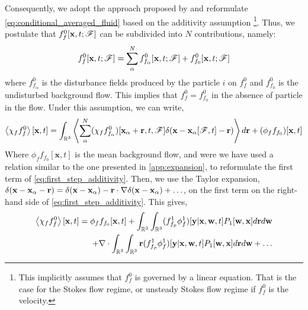 Consequently, we adopt the approach proposed by \citet{batchelor1972sedimentation} and reformulate \ref{eq:conditional_averaged_fluid} based on the additivity assumption \footnote{
    This implicitly assumes that $f_f^0$ is governed by a linear equation. 
    That is the case for the Stokes flow regime, or unsteady Stokes flow regime if $f_f^0$ is the velocity. 
}. 
Thus, we postulate that $f_f^0[\textbf{x},t;\mathscr{F}]$ can be subdivided into $N$ contributions, namely:  
\begin{equation}
    f_f^0[\textbf{x},t;\mathscr{F}]
    = 
    \sum_\alpha^N
    f_{f_\alpha}^0[\textbf{x},t;\mathscr{F}]
    + f_{f_0}^0[\textbf{x},t;\mathscr{F}]
\end{equation}
where $f_{f_\alpha}^0$ is the disturbance fields produced by the particle $i$ on $f_f^0$ and $f_{f_0}^0$ is the undisturbed background flow. 
This implies that $f_{f}^0 = f_{f_0}^0$ in the absence of particle in the flow. 
Under this assumption, we can write, 
\begin{equation}
    \avg{\chi_f f_f^0}[\textbf{x},t]
    = 
    \int_{\mathbb{R}^3} 
    \avg{
        \sum_\alpha^N 
    (\chi_f f_{f_\alpha}^0)[\textbf{x}_\alpha + \textbf{r},t,\FF] \delta(\textbf{x} - \textbf{x}_\alpha[\FF,t] - \textbf{r})}d\textbf{r}
    +( \phi_f f_{f_0})[\textbf{x},t]
    \label{eq:first_step_additivity}
\end{equation}
Where $\phi_f f_{f_0}[\textbf{x},t]$ is the mean background flow, and were we have used a relation similar to the one presented in \ref{app:expansion}, to reformulate the first term of \ref{eq:first_step_additivity}. 
Then, we use the Taylor expansion, $\delta(\textbf{x} - \textbf{x}_\alpha - \textbf{r}) =\delta(\textbf{x} - \textbf{x}_\alpha) - \textbf{r}\cdot \mathbf{\nabla}\delta(\textbf{x} - \textbf{x}_\alpha)+ \ldots$, on the first term on the right-hand side of \ref{eq:first_step_additivity}.
This gives,  
\begin{align}
    \avg{\chi_f f_f^0}[\textbf{x},t]
    = 
    \phi_f f_{f_0}[\textbf{x},t]
    + 
    \int_{\mathbb{R}^3} 
    \int_{\mathbb{R}^3} 
    (f_{f_p}^1\phi_f^1) [\textbf{y}|\textbf{x},\textbf{w},t] P_1[\textbf{w},\textbf{x}]
    d\textbf{r}
    d\textbf{w}
    \nonumber \\
    + 
    \div 
    \int_{\mathbb{R}^3} 
    \int_{\mathbb{R}^3} 
    \textbf{r}
    (f_{f_p}^1\phi_f^1) [\textbf{y}|\textbf{x},\textbf{w},t] P_1[\textbf{w},\textbf{x}]
    d\textbf{r}
    d\textbf{w}
    + \ldots
    \label{eq:f_f_1_def}
\end{align}
